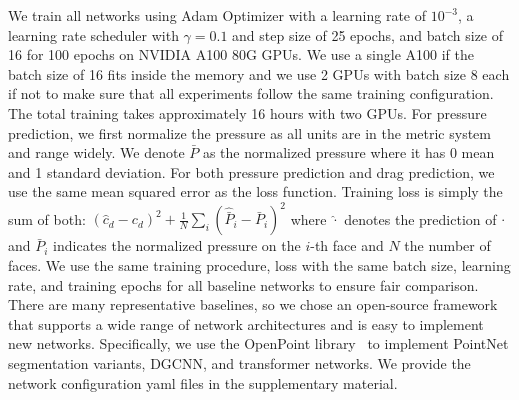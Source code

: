 We train all networks using Adam Optimizer with a learning rate of $10^{-3}$, a learning rate scheduler with $\gamma=0.1$ and step size of 25 epochs, and batch size of 16 for 100 epochs on NVIDIA A100 80G GPUs. We use a single A100 if the batch size of 16 fits inside the memory and we use 2 GPUs with batch size 8 each if not to make sure that all experiments follow the same training configuration. The total training takes approximately 16 hours with two GPUs.
For pressure prediction, we first normalize the pressure as all units are in the metric system and range widely. We denote $\bar{P}$ as the normalized pressure where it has 0 mean and 1 standard deviation.
For both pressure prediction and drag prediction, we use the same mean squared error as the loss function. Training loss is simply the sum of both: $(\hat{c}_d - c_d)^2 + \frac{1}{N}\sum_i(\hat{\bar{P}}_i - \bar{P}_i)^2$ where $\hat{\cdot}$ denotes the prediction of $\cdot$ and $\bar{P}_i$ indicates the normalized pressure on the $i$-th face and $N$ the number of faces. We use the same training procedure, loss with the same batch size, learning rate, and training epochs for all baseline networks to ensure fair comparison.
There are many representative baselines, so we chose an open-source framework that supports a wide range of network architectures and is easy to implement new networks. Specifically, we use the OpenPoint library~\citep{qian2022pointnext} to implement PointNet segmentation variants, DGCNN, and transformer networks. We provide the network configuration yaml files in the supplementary material.

